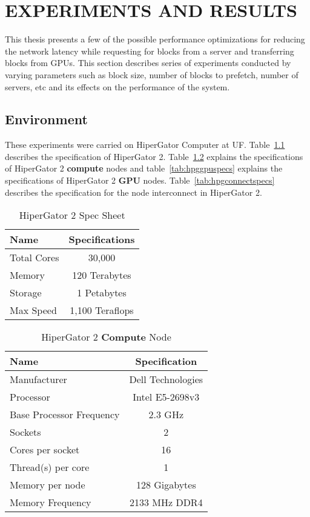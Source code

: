 \chapter{EXPERIMENTS AND RESULTS}\label{results}

This thesis presents a few of the possible performance optimizations for reducing
the network latency while requesting for blocks from a server and transferring
blocks from GPUs. This section describes series of experiments
conducted by varying parameters such as block size, number of blocks to prefetch,
number of servers, etc and its effects on the performance of the system.

\section{Environment}
These experiments were carried on HiperGator Computer at UF. Table~\ref{tab:hpg2spec}
describes the specification of HiperGator 2. Table~\ref{tab:hpgcomputespecs}
explains the specifications of HiperGator 2 \textbf{compute} nodes and
table~\ref{tab:hpggpuspecs} explains the specifications of HiperGator 2 \textbf{GPU}
nodes. Table~\ref{tab:hpgconnectspecs} describes the specification for the
node interconnect in HiperGator 2.

\begin{table}[h]
  \centering
  \caption{HiperGator 2 Spec Sheet}
  \begin{tabular}{l c}
    \hline
    Name        & Specifications  \\
    \hline
    Total Cores & 30,000          \\
    Memory      & 120 Terabytes   \\
    Storage     & 1 Petabytes     \\
    Max Speed   & 1,100 Teraflops \\
    \hline
  \end{tabular}
  \label{tab:hpg2spec}
\end{table}

\begin{table}[h]
  \centering
  \caption{HiperGator 2 \textbf{Compute} Node}
  \begin{tabular}{l c}
    \hline
    Name                       & Specification     \\
    \hline
    Manufacturer               & Dell Technologies \\
    Processor                  & Intel E5-2698v3   \\
    Base Processor Frequency   & 2.3 GHz           \\
    Sockets                    & 2                 \\
    Cores per socket           & 16                \\
    Thread(s) per core         & 1                 \\
    Memory per node            & 128 Gigabytes     \\
    Memory Frequency           & 2133 MHz DDR4     \\
    \hline
  \end{tabular}
  \label{tab:hpgcomputespecs}
\end{table}

